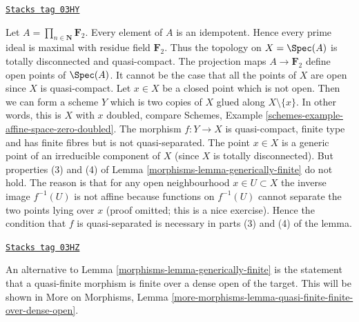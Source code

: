 \begin{example}
\label{morphisms-example-counter-generically-finite}
\href{https://stacks.math.columbia.edu/tag/03HY}{\texttt{Stacks tag 03HY}}

Let $A = \prod_{n \in \mathbf{N}} \mathbf{F}_2$.
Every element of $A$ is an idempotent. Hence every prime ideal is maximal
with residue field $\mathbf{F}_2$.
Thus the topology on $X = \Spec(A)$ is totally disconnected
and quasi-compact. The projection maps $A \to \mathbf{F}_2$ define open
points of $\Spec(A)$. It cannot be the case that all the points
of $X$ are open since $X$ is quasi-compact. Let $x \in X$ be a closed
point which is not open. Then we can form a scheme $Y$ which is two
copies of $X$ glued along $X \setminus \{x\}$. In other words, this
is $X$ with $x$ doubled, compare
Schemes, Example \ref{schemes-example-affine-space-zero-doubled}.
The morphism
$f : Y \to X$ is quasi-compact, finite type and has finite fibres
but is not quasi-separated.
The point $x \in X$ is a generic point of an irreducible component
of $X$ (since $X$ is totally disconnected). But properties (3) and (4)
of Lemma \ref{morphisms-lemma-generically-finite} do not hold. The reason is that
for any open neighbourhood $x \in U \subset X$ the inverse image
$f^{-1}(U)$ is not affine because functions on $f^{-1}(U)$ cannot
separate the two points lying over $x$ (proof omitted; this is a
nice exercise). Hence the condition that $f$ is quasi-separated is
necessary in parts (3) and (4) of the lemma.
\end{example}

\begin{remark}
\label{morphisms-remark-quasi-finite-finite-over-dense-open}
\href{https://stacks.math.columbia.edu/tag/03HZ}{\texttt{Stacks tag 03HZ}}

An alternative to
Lemma \ref{morphisms-lemma-generically-finite}
is the statement that a quasi-finite morphism is finite
over a dense open of the target. This will be shown in
More on Morphisms,
Lemma \ref{more-morphisms-lemma-quasi-finite-finite-over-dense-open}.
\end{remark}

